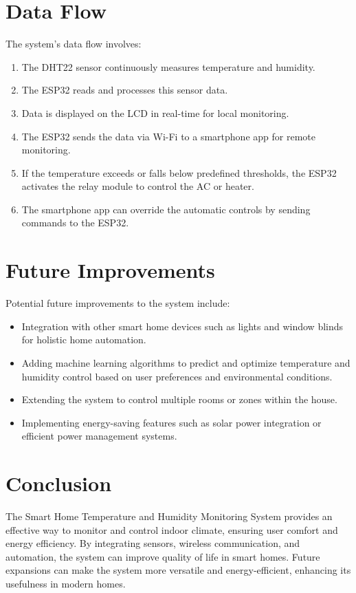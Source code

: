 \documentclass[a4paper,12pt]{article}
\begin{document}
\section{Data Flow}
The system’s data flow involves:
\begin{enumerate}
    \item The DHT22 sensor continuously measures temperature and humidity.
    \item The ESP32 reads and processes this sensor data.
    \item Data is displayed on the LCD in real-time for local monitoring.
    \item The ESP32 sends the data via Wi-Fi to a smartphone app for remote monitoring.
    \item If the temperature exceeds or falls below predefined thresholds, the ESP32 activates the relay module to control the AC or heater.
    \item The smartphone app can override the automatic controls by sending commands to the ESP32.
\end{enumerate}

\section{Future Improvements}
Potential future improvements to the system include:
\begin{itemize}
    \item Integration with other smart home devices such as lights and window blinds for holistic home automation.
    \item Adding machine learning algorithms to predict and optimize temperature and humidity control based on user preferences and environmental conditions.
    \item Extending the system to control multiple rooms or zones within the house.
    \item Implementing energy-saving features such as solar power integration or efficient power management systems.
\end{itemize}

\section{Conclusion}
The Smart Home Temperature and Humidity Monitoring System provides an effective way to monitor and control indoor climate, ensuring user comfort and energy efficiency. By integrating sensors, wireless communication, and automation, the system can improve quality of life in smart homes. Future expansions can make the system more versatile and energy-efficient, enhancing its usefulness in modern homes.
\end{document}
